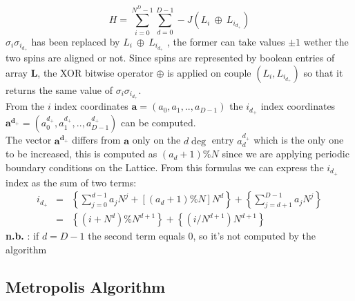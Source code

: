\documentclass[11pt,a4paper]{article}
\begin{document}
\begin{equation}
H = \sum_{i=0}^{N^D-1}\sum_{d=0}^{D-1}-J(L_i \ \oplus \ L_{i_{d_+}})
\end{equation}
$\sigma_i\sigma_{i_{d_+}}$ has been replaced by $L_i \ \oplus \ L_{i_{d_+}}$ , the former can take values $\pm1$ wether the two spins are aligned or not. Since spins are represented by boolean entries of array $\mathbf{L}$, the XOR bitwise operator $\oplus$ is applied on couple $(L_i,L_{i_{d_+}})$ so that it returns the same value of $\sigma_i\sigma_{i_{d_+}}$. \\
\vspace{0.1cm}
From the $i$ index coordinates $\mathbf{a} = (a_0,a_1,..,a_{D-1})$ the $i_{d_+}$ index coordinates
$\mathbf{a^{d_+}} = (a^{d_+}_0,a^{d_+}_1,..,a^{d_+}_{D-1})$ can be computed. \\
The vector $\mathbf{a^{d_+}}$ differs from $\mathbf{a}$
only on the $d\deg$ entry $a^{d_+}_d$ which is the only one to be increased, this is computed as $(a_d+1)\%N$ since we are applying periodic boundary conditions on the Lattice.
From this formulas we can express the $i_{d_+}$ index as the sum of two terms:
\begin{eqnarray*}
  i_{d_+} &=& \left\{ \sum_{j = 0}^{d-1}a_jN^j + [(a_d + 1)\%N]N^d \right\} + \left\{ \sum_{j = d+1}^{D-1}a_jN^j \right\}  \\
          &=& \left\{(i + N^d)\%N^{d+1} \right\}  +  \left\{ (i/N^{d+1})N^{d+1}  \right\}
\end{eqnarray*}
\textbf{n.b.} : if $d = D-1$ the second term equals 0, so it's not computed by the algorithm
\newpage


\subsection{Metropolis Algorithm}
\end{document}
